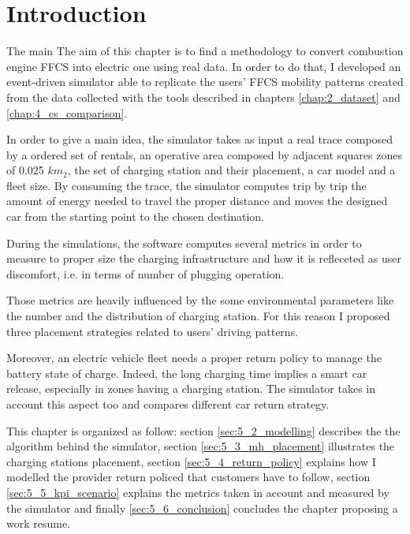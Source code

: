 \section{Introduction}
The main 
The aim of this chapter is to find a methodology to convert combustion engine FFCS into electric one using real data. In order to do that,  I developed an event-driven simulator able to replicate the users' FFCS mobility patterns created from the data collected with the tools described in chapters \ref{chap:2_dataset} and \ref{chap:4_cs_comparison}. 

In order to give a main idea, the simulator takes as input a real trace composed by a ordered set of rentals, an operative area composed by adjacent squares zones of 0.025 $km_2$, the set of charging station and their placement, a car model and a fleet size. By consuming the trace, the simulator computes trip by trip the amount of energy needed to travel the proper distance and moves the designed car from the starting point to the chosen destination.

During the simulations, the software computes several metrics in order to measure to proper size the charging infrastructure and how it is refleceted as user discomfort, i.e. in terms of number of plugging operation.

Those metrics are heavily influenced by the some environmental parameters like the number and the distribution of charging station. For this reason I proposed three placement strategies related to users' driving patterns. 

Moreover, an electric vehicle fleet needs a proper return policy to manage the battery state of charge. Indeed, the long charging time implies a smart car release, especially in zones having a charging station. The simulator takes in account this aspect too and compares different car return strategy.

This chapter is organized as follow: section \ref{sec:5_2_modelling} describes the the algorithm behind the simulator, section \ref{sec:5_3_mh_placement} illustrates the charging stations placement, section \ref{sec:5_4_return_policy} explains how I modelled the provider return policed that customers have to follow, section \ref{sec:5_5_kpi_scenario} explains the metrics taken in account and measured by the simulator and finally \ref{sec:5_6_conclusion} concludes the chapter proposing a work resume.